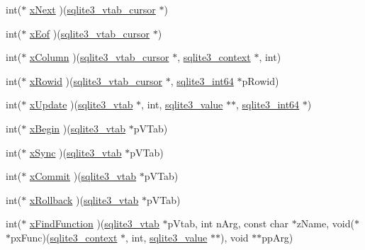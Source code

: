 \begin{DoxyCompactItemize}
\item 
int($\ast$ \hyperlink{structsqlite3__module_a7a95af281219212e50f3417f8c816bfc}{x\+Next} )(\hyperlink{structsqlite3__vtab__cursor}{sqlite3\+\_\+vtab\+\_\+cursor} $\ast$)
\item 
int($\ast$ \hyperlink{structsqlite3__module_afad8fda57fb28a01196230bc554e44b1}{x\+Eof} )(\hyperlink{structsqlite3__vtab__cursor}{sqlite3\+\_\+vtab\+\_\+cursor} $\ast$)
\item 
int($\ast$ \hyperlink{structsqlite3__module_a7cde490d5d06e19b90d768b90991f4a6}{x\+Column} )(\hyperlink{structsqlite3__vtab__cursor}{sqlite3\+\_\+vtab\+\_\+cursor} $\ast$, \hyperlink{sqlite3_8h_a3b519553ffec8fc42b2356f5b1ebdc57}{sqlite3\+\_\+context} $\ast$, int)
\item 
int($\ast$ \hyperlink{structsqlite3__module_a26c91e3a8a34d356ff36790488e4acf1}{x\+Rowid} )(\hyperlink{structsqlite3__vtab__cursor}{sqlite3\+\_\+vtab\+\_\+cursor} $\ast$, \hyperlink{sqlite3_8h_a0a4d3e6c1ad46f90e746b920ab6ca0d2}{sqlite3\+\_\+int64} $\ast$p\+Rowid)
\item 
int($\ast$ \hyperlink{structsqlite3__module_aa6c44549a07cc5bf36fae44930069ade}{x\+Update} )(\hyperlink{structsqlite3__vtab}{sqlite3\+\_\+vtab} $\ast$, int, \hyperlink{sqlite3_8h_ac2fa1ecdb2290d9af6010edbd1cbc83c}{sqlite3\+\_\+value} $\ast$$\ast$, \hyperlink{sqlite3_8h_a0a4d3e6c1ad46f90e746b920ab6ca0d2}{sqlite3\+\_\+int64} $\ast$)
\item 
int($\ast$ \hyperlink{structsqlite3__module_af190bd5cbd1e3ff30a09ca7b015af1a1}{x\+Begin} )(\hyperlink{structsqlite3__vtab}{sqlite3\+\_\+vtab} $\ast$p\+V\+Tab)
\item 
int($\ast$ \hyperlink{structsqlite3__module_a3a2dda4b384eef16bf939e3c25df7282}{x\+Sync} )(\hyperlink{structsqlite3__vtab}{sqlite3\+\_\+vtab} $\ast$p\+V\+Tab)
\item 
int($\ast$ \hyperlink{structsqlite3__module_a1d9fa3ed3dd16165cfcda3a532a7a3fc}{x\+Commit} )(\hyperlink{structsqlite3__vtab}{sqlite3\+\_\+vtab} $\ast$p\+V\+Tab)
\item 
int($\ast$ \hyperlink{structsqlite3__module_a2168ba5102151712f8bbfdc5b2ccaf9c}{x\+Rollback} )(\hyperlink{structsqlite3__vtab}{sqlite3\+\_\+vtab} $\ast$p\+V\+Tab)
\item 
int($\ast$ \hyperlink{structsqlite3__module_afb7bf9d156a767a50f5e9d92b135a80f}{x\+Find\+Function} )(\hyperlink{structsqlite3__vtab}{sqlite3\+\_\+vtab} $\ast$p\+Vtab, int n\+Arg, const char $\ast$z\+Name, void($\ast$$\ast$px\+Func)(\hyperlink{sqlite3_8h_a3b519553ffec8fc42b2356f5b1ebdc57}{sqlite3\+\_\+context} $\ast$, int, \hyperlink{sqlite3_8h_ac2fa1ecdb2290d9af6010edbd1cbc83c}{sqlite3\+\_\+value} $\ast$$\ast$), void $\ast$$\ast$pp\+Arg)

\end{DoxyCompactItemize}
